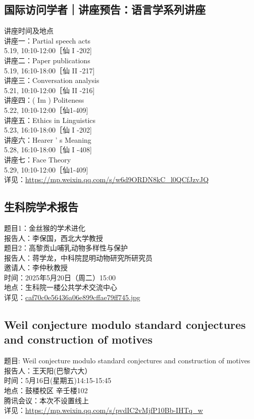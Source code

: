 \documentclass[letterpaper, 12pt]{article}
\begin{document}
\begin{multicols}{2}
\subsection{国际访问学者｜讲座预告：语言学系列讲座} %
讲座时间及地点
\\讲座一：Partial speech acts 
\\5.19, 10:10-12:00［仙 I -202]
\\讲座二：Paper publications 
\\5.19, 16:10-18:00［仙 II -217]
\\讲座三：Conversation analysis 
\\5.21, 10:10-12:00［仙 II -216]
\\讲座四：( Im ) Politeness 
\\5.22, 10:10-12:00［仙1-409]
\\讲座五：Ethics in Linguistics 
\\5.23, 16:10-18:00［仙 I -202]
\\讲座六：Hearer ' s Meaning 
\\5.28, 16:10-18:00［仙 I -408]
\\讲座七：Face Theory 
\\5.29, 10:10-12:00［仙1-409] 
\\详见：\url{https://mp.weixin.qq.com/s/w6d9ORDN8kC_l0QCfJzvJQ}

\subsection{生科院学术报告} %
题目1：金丝猴的学术进化
\\报告人：李保国，西北大学教授
\\题目2：高黎贡山哺乳动物多样性与保护
\\报告人：蒋学龙，中科院昆明动物研究所研究员
\\邀请人：李仲秋教授
\\时间：2025年5月20日（周二）15:00
\\地点：生科院一楼公共学术交流中心
\\详见：\url{caf70c0e56436a06e899cffae79ff745.jpg}

\subsection{Weil conjecture modulo standard conjectures and construction of motives} %
题目: Weil conjecture modulo standard conjectures and construction of motives
\\报告人：王天阳(巴黎六大）
\\时间：5月16日(星期五)14:15-15:45
\\地点：鼓楼校区 辛壬楼102
\\腾讯会议：本次不设置线上
\\详见：\url{https://mp.weixin.qq.com/s/pvdIC2vMjfP10Bb-IHTq_w}


\end{multicols}
\end{document}
